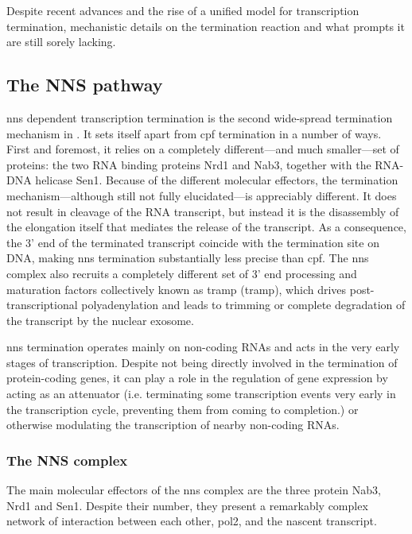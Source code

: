 Despite recent advances and the rise of a unified model for transcription termination, mechanistic details on the termination reaction and what prompts it are still sorely lacking.



\subsection{The NNS pathway}

\gls{nns} dependent transcription termination is the second wide-spread termination mechanism in \cer{}.
It sets itself apart from \gls{cpf} termination in a number of ways.
First and foremost, it relies on a completely different---and much smaller---set of proteins: the two RNA binding proteins Nrd1 and Nab3, together with the RNA-DNA helicase Sen1.
Because of the different molecular effectors, the termination mechanism---although still not fully elucidated---is appreciably different.
It does not result in cleavage of the RNA transcript, but instead it is the disassembly of the elongation itself that mediates the release of the transcript. 
As a consequence, the 3' end of the terminated transcript coincide with the termination site on DNA, making \gls{nns} termination substantially less precise than \gls{cpf}.
The \gls{nns} complex also recruits a completely different set of 3' end processing and maturation factors collectively known as \gls{tramp} (\glsdesc{tramp}), which drives post-transcriptional polyadenylation and leads to trimming or complete degradation of the transcript by the nuclear exosome. 

\gls{nns} termination operates mainly on non-coding RNAs and acts in the very early stages of transcription.
Despite not being directly involved in the termination of protein-coding genes, it can play a role in the regulation of gene expression by acting as an attenuator (i.e. terminating some transcription events very early in the transcription cycle, preventing them from coming to completion.) or otherwise modulating the transcription of nearby non-coding RNAs.


\subsubsection{The NNS complex}

The main molecular effectors of the \gls{nns} complex are the three protein Nab3, Nrd1 and Sen1.
Despite their number, they present a remarkably complex network of interaction between each other, \gls{pol2}, and the nascent transcript.

